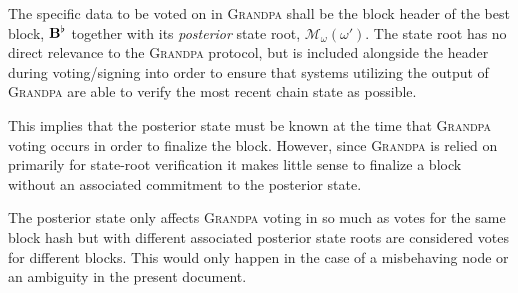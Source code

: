 The specific data to be voted on in \textsc{Grandpa} shall be the block header of the best block, $\mathbf{B}^\flat$ together with its \emph{posterior} state root, $\mathcal{M}_\omega(\omega')$. The state root has no direct relevance to the \textsc{Grandpa} protocol, but is included alongside the header during voting/signing into order to ensure that systems utilizing the output of \textsc{Grandpa} are able to verify the most recent chain state as possible.

This implies that the posterior state must be known at the time that \textsc{Grandpa} voting occurs in order to finalize the block. However, since \textsc{Grandpa} is relied on primarily for state-root verification it makes little sense to finalize a block without an associated commitment to the posterior state.

The posterior state only affects \textsc{Grandpa} voting in so much as votes for the same block hash but with different associated posterior state roots are considered votes for different blocks. This would only happen in the case of a misbehaving node or an ambiguity in the present document.
